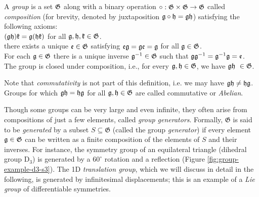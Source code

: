 \begin{tcolorbox}[width=\linewidth,
                  boxsep=0pt,
                  left=7.5pt,
                  right=7.5pt,
                  top=7.5pt,
                  bottom=7.5pt,
                  arc=0pt,
                  boxrule=0pt,toprule=0pt,
                  colback=boxgray,
                  ]%
A {\em group} is a set ${\mathfrak{G}}$ along with a binary operation $\circ : {\mathfrak{G}} \times {\mathfrak{G}} \rightarrow {\mathfrak{G}}$ called {\em composition} (for brevity, denoted by juxtaposition ${\mathfrak{g}} \circ {\mathfrak{h}} = {\mathfrak{g}} {\mathfrak{h}}$) 
satisfying the following axioms: \vspace{3mm}\\
     $({\mathfrak{g}} {\mathfrak{h}}) {\mathfrak{k}} = {\mathfrak{g}} ({\mathfrak{h}} {\mathfrak{k}})$ for all ${\mathfrak{g}}, {\mathfrak{h}}, {\mathfrak{k}} \in {\mathfrak{G}}$.\vspace{2mm}\\
     there exists a unique ${\mathfrak{e}} \in {\mathfrak{G}}$ satisfying ${\mathfrak{e}} {\mathfrak{g}} = {\mathfrak{g}} {\mathfrak{e}} = {\mathfrak{g}}$ for all ${\mathfrak{g}} \in {\mathfrak{G}}$.\vspace{2mm}\\
     For each ${\mathfrak{g}} \in {\mathfrak{G}}$ there is a unique inverse ${\mathfrak{g}}^{-1} \in {\mathfrak{G}}$ such that ${\mathfrak{g}} {\mathfrak{g}}^{-1} = {\mathfrak{g}}^{-1} {\mathfrak{g}} = {\mathfrak{e}}$.\vspace{2mm}\\
     The group is closed under composition, i.e., for every ${\mathfrak{g}}, {\mathfrak{h}} \in {\mathfrak{G}}$, we have ${\mathfrak{g}} {\mathfrak{h}} \ \in {\mathfrak{G}}$.

\end{tcolorbox}
Note that \emph{commutativity} is not part of this definition, i.e. we may have ${\mathfrak{g}} {\mathfrak{h}} \neq {\mathfrak{h}} {\mathfrak{g}}$.
Groups for which ${\mathfrak{g}} {\mathfrak{h}} = {\mathfrak{h}} {\mathfrak{g}}$ for all ${\mathfrak{g}}, {\mathfrak{h}} \in {\mathfrak{G}}$ are called commutative or {\em Abelian}.

Though some groups can be very large and even infinite, they often arise from compositions of just a few elements, called {\em group generators}. Formally, $\mathfrak{G}$ is said to be {\em generated} by a subset $S \subseteq \mathfrak{G}$ (called the group {\em generator}) if every element ${\mathfrak{g}} \in {\mathfrak{G}}$ can be written as a finite composition of the elements of $S$ and their inverses. 
%
For instance, the symmetry group of an equilateral triangle (dihedral group $\mathrm{D}_3$) is generated by a $60^\circ$ rotation and a reflection (Figure \ref{fig:group-example-d3-s3}). 
%
The 1D {\em translation group}, which we will discuss in detail in the following, is generated by infinitesimal displacements; this is an example of a {\em Lie group} of differentiable symmetries. 


